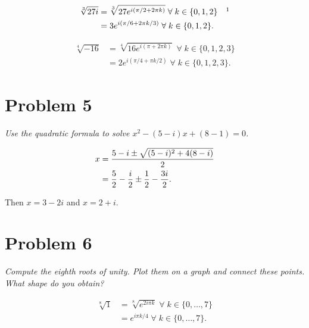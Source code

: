 \documentclass{tufte-handout}
\begin{document}
\begin{align*}
  \sqrt[3]{27 i} &= \sqrt[3]{27 e^{i (\pi / 2 + 2 \pi k)}} \; \forall
  \; k \in \{0,1,2\} && \footnotemark\\
                 &= 3 e^{i (\pi / 6 + 2 \pi k / 3)} \; \forall \; k
                   \in \{0,1,2\}.
\end{align*}

\begin{align*}
  \sqrt[4]{-16} &= \sqrt[4]{16e^{i(\pi + 2\pi k)}} \; \forall \; k \in \{0,1,2,3\}\\
                &= 2e^{i(\pi / 4 + \pi k / 2)} \; \forall \; k \in \{0,1,2,3\}.
\end{align*}

\section{Problem 5}

\begin{description}
\item \textit{Use the quadratic formula to solve
    $x^2 - (5 - i)x + (8 - 1) = 0$.}
\end{description}

\begin{align*}
  x &= {5 - i \pm \sqrt{(5 - i)^2 + 4(8 - i)} \over 2}\\
    &= {5 \over 2} - {i \over 2} \pm {1 \over 2} - {3 i \over 2}.
\end{align*}

Then $x = 3 - 2 i$ and $x = 2 + i$.

\section{Problem 6}

\begin{description}
\item \textit{Compute the eighth roots of unity. Plot them on a graph and
  connect these points. What shape do you obtain?}
\end{description}

\begin{align*}
  \sqrt[8]{1} &= \sqrt[8]{e^{2 i \pi k}} \; \forall \; k \in
                \{0,\ldots,7\}\\
              &= e^{i \pi k/ 4} \; \forall \; k \in \{0,\ldots,7\}.
\end{align*}
\end{document}
